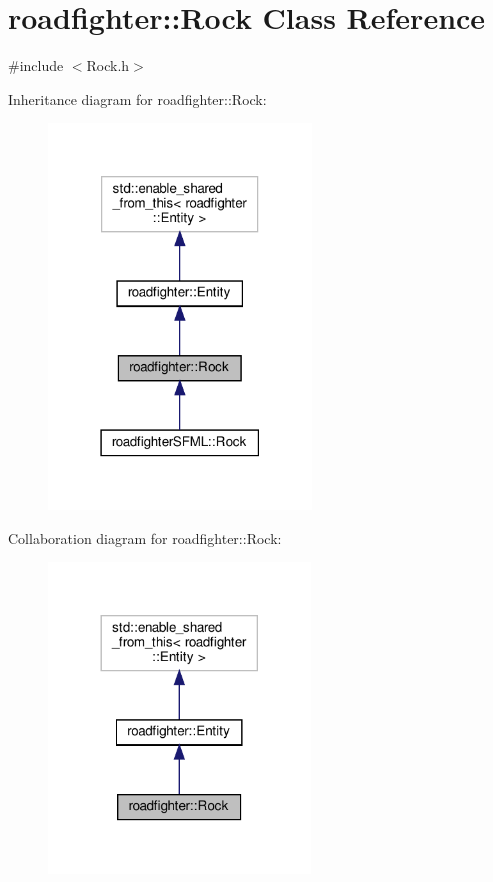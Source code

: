 \hypertarget{classroadfighter_1_1Rock}{}\section{roadfighter\+:\+:Rock Class Reference}
\label{classroadfighter_1_1Rock}


{\ttfamily \#include $<$Rock.\+h$>$}



Inheritance diagram for roadfighter\+:\+:Rock\+:\nopagebreak
\begin{figure}[H]
\begin{center}
\leavevmode
\includegraphics[width=198pt]{classroadfighter_1_1Rock__inherit__graph}
\end{center}
\end{figure}


Collaboration diagram for roadfighter\+:\+:Rock\+:\nopagebreak
\begin{figure}[H]
\begin{center}
\leavevmode
\includegraphics[width=197pt]{classroadfighter_1_1Rock__coll__graph}
\end{center}
\end{figure}
